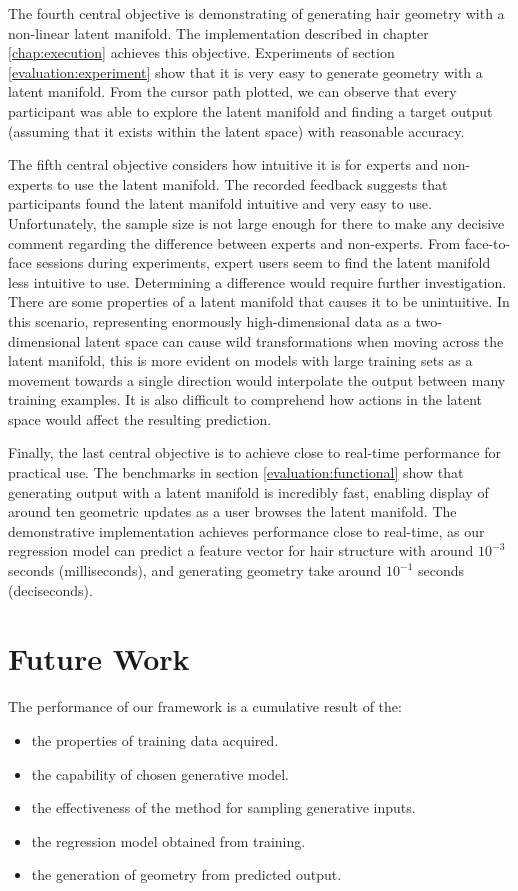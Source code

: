 \documentclass[ %
author={Dillon Keith Diep},
supervisor={Dr. Carl Henrik Ek},
degree={MEng},
title={ART-CG Hair:},
subtitle={Assisted Real-time Content Generation of Stylised Virtual Hair},
type={Research},
year={2017} ]{dissertation}
\begin{document}
The fourth central objective is demonstrating of generating hair geometry with a non-linear latent manifold. The implementation described in chapter \ref{chap:execution} achieves this objective. 
Experiments of section \ref{evaluation:experiment} show that it is very easy to generate geometry with a latent manifold. From the cursor path plotted, we can observe that every participant was able to explore the latent manifold and finding a target output (assuming that it exists within the latent space) with reasonable accuracy.

The fifth central objective considers how intuitive it is for experts and non-experts to use the latent manifold. The recorded feedback suggests that participants found the latent manifold intuitive and very easy to use. Unfortunately, the sample size is not large enough for there to make any decisive comment regarding the difference between experts and non-experts. From face-to-face sessions during experiments, expert users seem to find the latent manifold less intuitive to use. Determining a difference would require further investigation. There are some properties of a latent manifold that causes it to be unintuitive. In this scenario, representing enormously high-dimensional data as a two-dimensional latent space can cause wild transformations when moving across the latent manifold, this is more evident on models with large training sets as a movement towards a single direction would interpolate the output between many training examples. It is also difficult to comprehend how actions in the latent space would affect the resulting prediction.

Finally, the last central objective is to achieve close to real-time performance for practical use. The benchmarks in section \ref{evaluation:functional} show that generating output with a latent manifold is incredibly fast, enabling display of around ten geometric updates as a user browses the latent manifold. The demonstrative implementation achieves performance close to real-time, as our regression model can predict a feature vector for hair structure with around $10^{-3}$ seconds (milliseconds), and generating geometry take around $10^{-1}$ seconds (deciseconds).

\section{Future Work}
The performance of our framework is a cumulative result of the: 
\begin{itemize}
	\item the properties of training data acquired.
	\item the capability of chosen generative model.
	\item the effectiveness of the method for sampling generative inputs.
	\item the regression model obtained from training.
	\item the generation of geometry from predicted output.
\end{itemize}
\end{document}
